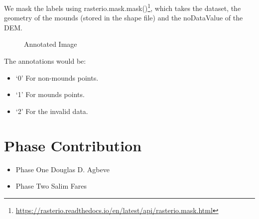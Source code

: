 \documentclass[sigconf,natbib=false]{acmart}
\begin{document}
We mask the labels using rasterio.mask.mask()\footnote{\url{https://rasterio.readthedocs.io/en/latest/api/rasterio.mask.html}}, which takes the dataset, the geometry of the mounds (stored in the shape file) and the noDataValue of the DEM. 
\begin{figure}[ht]
    \centering
    \caption{Annotated Image}
\end{figure}
\newline
\newline
The annotations would be:
\begin{itemize}
    \item ‘0’ For non-mounds points.
    \item ‘1’ For mounds points.
    \item ‘2’ For the invalid data.
\end{itemize}


\newpage
\printbibliography{}
\appendix
\section{Phase Contribution}
\begin{itemize}
    \item Phase One \hspace{2em} Douglas D. Agbeve
    \item Phase Two \hspace{2em} Salim Fares 
\end{itemize}
\end{document}
